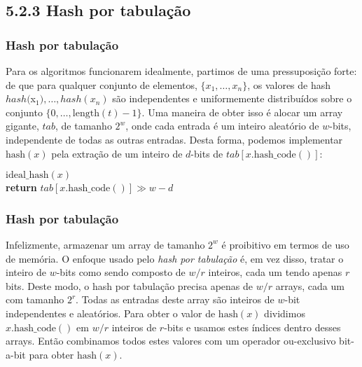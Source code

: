 \documentclass{beamer}
\begin{document}
\subsection{5.2.3 Hash por tabulação}
\begin{frame}
\frametitle{Hash por tabulação}
Para os algoritmos funcionarem idealmente, partimos de uma pressuposição forte: de que para qualquer conjunto de elementos, $\{\ensuremath{\ensuremath{x}}_1,\ldots,\ensuremath{\ensuremath{x}}_\ensuremath{\ensuremath{n}}\}$,
os valores de hash  $\ensuremath{\ensuremath{\ensuremath{\mathit{hash}}}}($x$_1),\ldots,\ensuremath{\ensuremath{\ensuremath{\mathit{hash}}}}(\ensuremath{\ensuremath{x}}_\ensuremath{\ensuremath{n}})$ são independentes e uniformemente distribuídos sobre o conjunto $\{0,\ldots,\ensuremath{\ensuremath{\mathrm{length}(t)}}-1\}$.  Uma maneira de obter isso é alocar um array gigante, \ensuremath{\ensuremath{\ensuremath{\mathit{tab}}}}, de tamanho $2^w$,
onde cada entrada é um inteiro aleatório de \ensuremath{\ensuremath{w}}-bits, independente de todas as outras entradas.  Desta forma, podemos implementar \ensuremath{\ensuremath{\mathrm{hash}(x)}} pela extração de um inteiro de \ensuremath{\ensuremath{d}}-bits de \ensuremath{\ensuremath{\ensuremath{\mathit{tab}}[x.\mathrm{hash\_code}()]}}:
\begin{oframed}
\begin{flushleft}
\hspace*{1em} \ensuremath{\mathrm{ideal\_hash}(x)}\\
\hspace*{1em} \hspace*{1em} {\color{black} \textbf{return}} \ensuremath{\ensuremath{\mathit{tab}}[x.\mathrm{hash\_code}()] \ensuremath{\gg} w-d}\\
\end{flushleft}
\end{oframed}
\end{frame}

\begin{frame}
\frametitle{Hash por tabulação}
Infelizmente, armazenar um array de tamanho $2^w$ é proibitivo em termos de uso de memória.  O enfoque usado pelo \emph{hash por tabulação} é, em vez disso, tratar o inteiro de \ensuremath{\ensuremath{w}}-bits como sendo composto de $\ensuremath{\ensuremath{w}}/\ensuremath{\ensuremath{r}}$
inteiros, cada um tendo apenas $\ensuremath{\ensuremath{r}}$ bits.  Deste modo, o hash por tabulação precisa apenas de  $\ensuremath{\ensuremath{w}}/\ensuremath{\ensuremath{r}}$ arrays, cada um com tamanho $2^{\ensuremath{\ensuremath{r}}}$.  Todas as entradas deste array são inteiros de \ensuremath{\ensuremath{w}}-bit independentes e aleatórios.  Para obter o valor de \ensuremath{\ensuremath{\mathrm{hash}(x)}} dividimos  \ensuremath{\ensuremath{x.\mathrm{hash\_code}()}} em $\ensuremath{\ensuremath{w}}/\ensuremath{\ensuremath{r}}$ inteiros de \ensuremath{\ensuremath{r}}-bits e usamos estes índices dentro desses arrays.  Então combinamos todos estes valores com um operador ou-exclusivo bit-a-bit para obter \ensuremath{\ensuremath{\mathrm{hash}(x)}}.

\end{frame}
\end{document}
